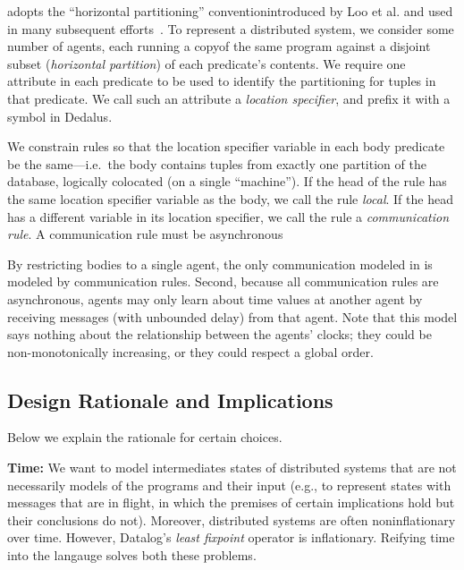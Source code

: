 
\lang adopts the ``horizontal partitioning'' conventionintroduced by Loo et al. and used in many subsequent efforts~\cite{Loo:2005}. To represent a distributed system, we consider some number of agents, each running a copyof the same program against a disjoint subset ({\em horizontal partition}) of each predicate's contents.  We require one attribute in each predicate to be used to identify the partitioning for tuples in that predicate. We call such an attribute a {\em location specifier}, and prefix it with a \dedalus{\#} symbol in Dedalus.

We constrain \lang rules so that the location specifier variable in each body predicate be the same---i.e.\ the body contains tuples from exactly one partition of the database, logically colocated (on a single ``machine'').  If the head of the rule has the same location specifier variable as the body, we call the rule {\em local}.
If the head has a different variable in its location specifier, we call the rule a {\em communication rule}.  A communication rule must be asynchronous

By restricting bodies to a single agent, the only communication
modeled in \lang is modeled by communication rules.  Second, because
all communication rules are asynchronous, agents may only learn about
time values at another agent by receiving messages (with unbounded
delay) from that agent.  Note that this model says nothing about the
relationship between the agents' clocks; they could be
non-monotonically increasing, or they could respect a global order.

\subsection{Design Rationale and Implications}

Below we explain the rationale for certain choices.

{\bf Time:}
We want to model intermediates states of distributed systems that are not necessarily models of the programs and their
input (e.g., to represent states with messages that are in flight, in which the premises
of certain implications hold but their conclusions do not).
Moreover, distributed systems are often noninflationary over time.  However, Datalog's {\em least fixpoint} operator is inflationary.  Reifying time into the langauge solves both these problems.

